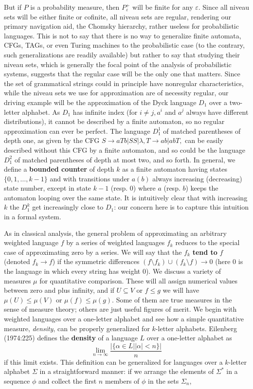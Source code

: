 But if $P$ is a probability measure, then $P_{\varepsilon}^+$ will be finite
for any $ \varepsilon$. Since all niveau sets will be either finite or
cofinite, all niveau sets are regular, rendering our primary navigation aid,
the Chomsky hierarchy, rather useless for probabilistic languages. This is not
to say that there is no way to generalize finite automata, CFGs, TAGs, or even
Turing machines to the probabilistic case (to the contrary, such
generalizations are readily available) but rather to say that studying their
niveau sets, which is generally the focal point of the analysis of
probabilistic systems, suggests that the regular case will be the only one
that matters.  Since the set of grammatical strings could in principle have
nonregular characteristics, while the niveau sets we use for approximation
are of necessity regular, our driving example will be the approximation of the
Dyck language $D_1$ over a two-letter alphabet. As $D_1$ has infinite index
(for $i\neq j, a^i$ and $a^j$ always have different distributions), it cannot
be described by a finite automaton, so no regular approximation can ever be
perfect.  The language $D_1^1$ of matched parentheses of depth one, as given
by the CFG $S\rightarrow aTb | SS | \lambda, T \rightarrow ab | abT,$ can be
easily described without this CFG by a finite automaton, and so could be the
language $D_1^2$ of matched parentheses of depth at most two, and so forth. In
general, we define a {\bf bounded counter} of depth $k$ as a finite automaton
having states $\{0,1, \ldots,k-1\}$ and with transitions under $a (b)$ always
increasing (decreasing) state number, except in state $k-1$ (resp. 0) where
$a$ (resp. $b$) keeps the automaton looping over the same
state.
It is intuitively clear that with increasing $k$ the $D_1^k$
get increasingly close to $D_1$: our concern here is to capture this intuition
in a formal system.

As in classical analysis, the general problem of approximating an arbitrary
weighted language $f$ by a series of weighted languages $f_k$ reduces to the
special case of approximating zero by a series. We will say that the $f_k$
{\bf tend to} $f$ (denoted $f_k \rightarrow f$) if the symmetric differences
$(f \setminus f_k) \cup (f_k \setminus f) \rightarrow 0$ (here $0$ is the
language in which every string has weight 0). We discuss a variety of measures
$\mu$ for quantitative comparison. These will all assign numerical values
between zero and plus infinity, and if $U \subseteq V$ or $f \leq g$ we will
have $\mu(U) \leq \mu(V)$ or $\mu(f) \leq \mu(g)$. Some of them are true
measures in the sense of measure theory; others are just useful figures of
merit.  We begin with weighted languages over a one-letter alphabet and see
how a simple quantitative measure, {\it density}, can be properly generalized
for $k$-letter alphabets.  Eilenberg (1974:225) defines the {\bf density} of
a language $L$ over a one-letter alphabet as \[\lim_{n \rightarrow \infty}
\frac{| \{ \alpha \in L | |\alpha| < n \} |}{n}\] if this limit exists.
This definition can be generalized for languages over a $k$-letter alphabet
$\Sigma$ in a straightforward manner: if we arrange the elements of $\Sigma^*$
in a sequence $\phi$ and collect the first $n$ members of $\phi$ in the sets
$\Sigma_n$,

